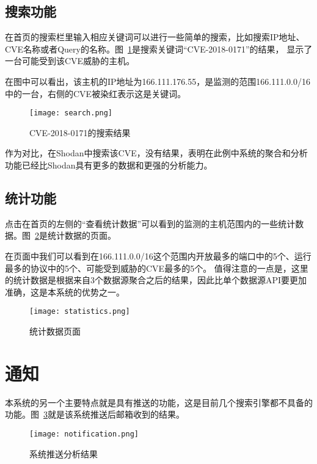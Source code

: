 \subsection{搜索功能}
\label{sec:search}

在首页的搜索栏里输入相应关键词可以进行一些简单的搜索，比如搜索IP地址、CVE名称或者Query的名称。图~\ref{fig:search}是搜索关键词“CVE-2018-0171”的结果，
显示了一台可能受到该CVE威胁的主机。

在图中可以看出，该主机的IP地址为166.111.176.55，是监测的范围166.111.0.0/16中的一台，右侧的CVE被染红表示这是关键词。

\begin{figure}[H]
    \centering
    \texttt{[image: search.png]}
    \caption{CVE-2018-0171的搜索结果}
    \label{fig:search}
\end{figure}

作为对比，在Shodan中搜索该CVE，没有结果，表明在此例中系统的聚合和分析功能已经比Shodan具有更多的数据和更强的分析能力。

\subsection{统计功能}
\label{sec:statistics}

点击在首页的左侧的“查看统计数据”可以看到的监测的主机范围内的一些统计数据。图~\ref{fig:statistics}是统计数据的页面。

在页面中我们可以看到在166.111.0.0/16这个范围内开放最多的端口中的5个、运行最多的协议中的5个、可能受到威胁的CVE最多的5个。
值得注意的一点是，这里的统计数据是根据来自3个数据源聚合之后的结果，因此比单个数据源API要更加准确，这是本系统的优势之一。

\begin{figure}[H]
    \centering
    \texttt{[image: statistics.png]}
    \caption{统计数据页面}
    \label{fig:statistics}
\end{figure}

\section{通知}
\label{sec:notification}

本系统的另一个主要特点就是具有推送的功能，这是目前几个搜索引擎都不具备的功能。图~\ref{fig:notification}就是该系统推送后邮箱收到的结果。

\begin{figure}[H]
    \centering
    \texttt{[image: notification.png]}
    \caption{系统推送分析结果}
    \label{fig:notification}
\end{figure}

